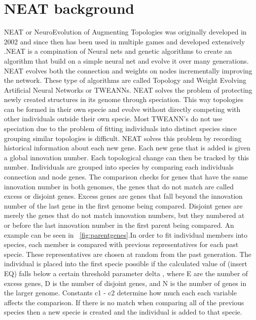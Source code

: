 \documentclass[12pt]{ucthesis} \newif\ifpdf \ifx\pdfoutput\undefined
\begin{document}
\section{NEAT background}

NEAT or NeuroEvolution of Augmenting Topologies  was originally developed in
2002 and since then has been used in multiple games and developed extensively
\cite{stanley:phd04}.NEAT is a compination of Neural nets and genetic algorithms
to create an algorithm that build on a simple neural net and evolve it over many
generations. NEAT evolves both the connection and weights on nodes incrementally
improving the network. These type of algorithms are called Topology and Weight
Evolving Artiﬁcial Neural Networks or TWEANNs. NEAT solves the problem of
protecting newly created structures in its genome through speciation. This way
topologies can be formed in their own specie and evolve without directly
competing with other individuals outside their own specie. Most TWEANN’s do not
use speciation due to the problem of fitting individuals into distinct species
since grouping similar topologies is difficult. NEAT solves this problem by
recording historical information about each new gene. Each new gene that is
added is given a global innovation number. Each topological change can then be
tracked by this number. Individuals are grouped into species by comparing each
individuals connection and node genes. The comparison checks for genes that have
the same innovation number in both genomes, the genes that do not match are
called excess or disjoint genes. Excess genes are genes that fall beyond the
innovation number of the last gene in the first genome being compared. Disjoint
genes are merely the genes that do not match innovation numbers, but they
numbered at or before the last innovation number in the first parent being
compared. An example can be seen in  ~\ref{fig:parentgenes}.In order to fit
individual members into species, each member is compared with previous
representatives for each past specie. These representatives are chosen at random
from the past generation. The individual is placed into the first specie
possible if the calculated value of (insert EQ) falls below a certain threshold
parameter delta , where E are the number of excess genes, D is the number of
disjoint genes, and N is the number of genes in the larger genome. Constants c1
- c2 determine how much each each variable affects the comparison. If there is
no match when comparing all of the previous species then a new specie is created
and the individual is added to that specie.
\end{document}
